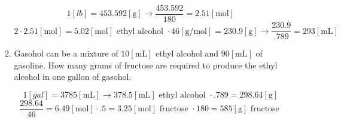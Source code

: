 \documentclass[12pt]{article}
\begin{document}
\begin{enumerate}
\begin{enumerate}
        $$1[lb]=453.592[\si{\gram}]\rightarrow\frac{453.592}{180}=2.51[\si{\mole}]$$ 
        $$2\cdot2.51[\si{\mole}]=5.02[\si{\mole}]\text{ ethyl alcohol }\cdot46[\si{\gram\per\mole}]=230.9[\si{\gram}]\rightarrow\frac{230.9}{.789}=293[\si{\milli\liter}]$$

      \item Gasohol can be a mixture of $10[\si{\milli\liter}]$ ethyl alcohol and $90[\si{\milli\liter}]$ of gasoline. How many grams of fructose are required to produce the ethyl alcohol in one gallon of gasohol.

        $$1[gal]=3785[\si{\milli\liter}]\rightarrow378.5[\si{\milli\liter}]\text{ ethyl alcohol }\cdot.789=298.64[\si{\gram}]$$
        $$\frac{298.64}{46}=6.49[\si{\mole}]\cdot .5=3.25[\si{\mole}]\text{ fructose }\cdot 180=585[\si{\gram}]\text{ fructose }$$

    \end{enumerate}

\end{enumerate}
\end{document}
